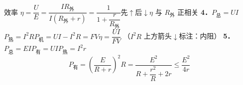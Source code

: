 效率 $\eta=\dfrac{U}{E}=\dfrac{IR_{\text{外}}}{I(R_{\text{外}}+r)}=\dfrac{1}{1+\dfrac{r}{R_{\text{外}}}}$\quad 先$\uparrow$后$\downarrow$\quad $\eta$ 与 $R_{\text{外}}$ 正相关 %
\textbf{4．}\quad $P_{\text{总}}=UI$\quad $P_{\text{热}}=I^2R$\quad $P_{\text{机}}=UI-I^2R=FV$\quad $\eta=\dfrac{UI}{FV}$ %
（$I^2R$ 上方箭头$\downarrow$标注：内阻）
\textbf{5．}\quad $P_{\text{总}}=EI$\quad $P_{\text{有}}=UI$\quad $P_{\text{热}}=I^2r$
\[P_{\text{有}}=\left(\frac{E}{R+r}\right)^2R=\frac{E^2}{R+\dfrac{r^2}{R}+2r}\le\frac{E^2}{4r}\]

